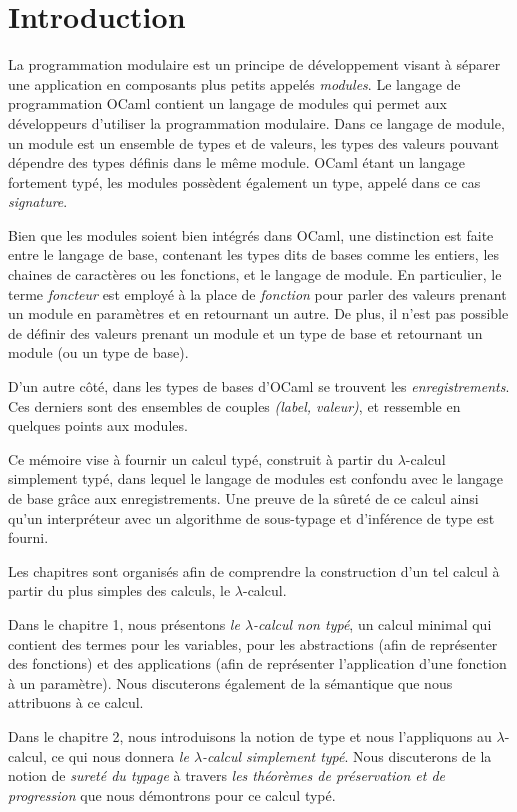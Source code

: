 \chapter*{Introduction}

La programmation modulaire est un principe de développement visant à séparer une
application en composants plus petits appelés \textit{modules}. Le langage de
programmation OCaml contient un langage de modules qui permet aux développeurs
d'utiliser la programmation modulaire. Dans ce langage de module, un module est
un ensemble de types et de valeurs, les types des valeurs pouvant dépendre des
types définis dans le même module.
OCaml étant un langage fortement typé, les modules possèdent également
un type, appelé dans ce cas \textit{signature}.

Bien que les modules soient bien intégrés dans OCaml, une
distinction est faite entre le langage de base, contenant les types dits \og de
bases \fg comme les entiers, les chaines de caractères ou les fonctions, et le
langage de module. En particulier, le terme \textit{foncteur} est employé à la
place de \textit{fonction} pour parler des valeurs prenant un module en
paramètres et en retournant un autre. De plus, il n'est pas possible de définir
des valeurs prenant un module et un type de base et retournant un module (ou un
type de base).

D'un autre côté, dans les types de bases d'OCaml se trouvent les
\textit{enregistrements}. Ces derniers sont des ensembles de couples
\textit{(label, valeur)}, et ressemble en quelques points aux modules.

Ce mémoire vise à fournir un calcul typé, construit à partir du $\lambda$-calcul
simplement typé, dans lequel le langage de modules est confondu avec le langage
de base grâce aux enregistrements. Une preuve de la sûreté de ce calcul ainsi
qu'un interpréteur avec un algorithme de sous-typage et d'inférence de type est
fourni.

Les chapitres sont organisés afin de comprendre la construction d'un tel calcul
à partir du plus simples des calculs, le $\lambda$-calcul.

Dans le chapitre 1, nous présentons \textit{le $\lambda$-calcul non typé}, un calcul
minimal qui contient des termes pour les variables, pour les abstractions (afin
de représenter des fonctions) et des applications (afin de représenter
l'application d'une fonction à un paramètre). Nous discuterons également de la
sémantique que nous attribuons à ce calcul. 

Dans le chapitre 2, nous introduisons la notion de type et nous l'appliquons au
$\lambda$-calcul, ce qui nous donnera \textit{le $\lambda$-calcul simplement typé}. Nous
discuterons de la notion de \textit{sureté du typage} à travers \textit{les théorèmes
de préservation et de progression} que nous démontrons pour ce calcul typé.

